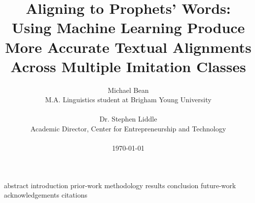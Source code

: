 \documentclass {journal}
\begin{document}
\def \JoDPagesTotal {2215}
\def \JoDPagesGoldStandard {2215}
\def \JoDCitationsTotal {11000}

\title{Aligning to Prophets' Words:\\
Using Machine Learning Produce More Accurate Textual Alignments Across Multiple Imitation Classes}

\author{Michael Bean\\
M.A. Linguistics student at Brigham Young University\\
\\
Dr. Stephen Liddle\\
Academic Director, Center for Entrepreneurship and Technology\\
\\
\today
}
\maketitle

 {abstract}
 {introduction}
 {prior-work}
 {methodology}
 {results}
 {conclusion}
 {future-work}
 {acknowledgements}
 {citations}
\end{document}
